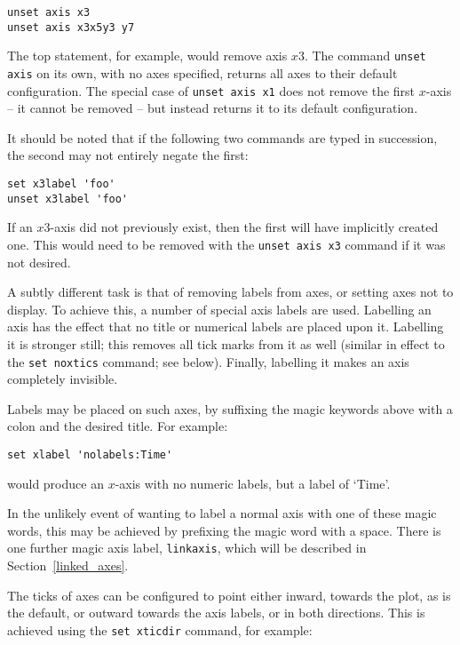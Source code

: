 \begin{verbatim}
unset axis x3
unset axis x3x5y3 y7
\end{verbatim}

\noindent The top statement, for example, would remove axis $x3$. The command
{\tt unset axis} on its own, with no axes specified, returns all axes to
their default configuration.  The special case of {\tt unset axis x1} does
not remove the first $x$-axis -- it cannot be removed -- but instead returns it
to its default configuration.

It should be noted that if the following two commands are typed in succession,
the second may not entirely negate the first:

\begin{verbatim}
set x3label 'foo'
unset x3label 'foo'
\end{verbatim}

\noindent If an $x3$-axis did not previously exist, then the first will have
implicitly created one. This would need to be removed with the {\tt unset axis
x3} command if it was not desired.

A subtly different task is that of removing labels from axes, or setting axes
not to display. To achieve this, a number of special axis labels are used.
Labelling an axis  has the effect that no title or numerical
labels are placed upon it. Labelling it\label{nolabelstics}
 is stronger still; this removes all tick marks from it
as well (similar in effect to the {\tt set noxtics} command; see below).
Finally, labelling it  makes an axis completely invisible.

Labels may be placed on such axes, by suffixing the magic keywords above with a
colon and the desired title. For example:

\begin{verbatim}
set xlabel 'nolabels:Time'
\end{verbatim}

\noindent would produce an $x$-axis with no numeric labels, but a label of
`Time'.

In the unlikely event of wanting
to label a normal axis with one of these magic words, this may be achieved by prefixing the magic
word with a space. There is one further magic axis label, {\tt linkaxis},
which will be described in Section~\ref{linked_axes}.

The ticks of axes can be configured to point either inward, towards the plot,
as is the default, or outward towards the axis labels, or in both directions.
This is achieved using the {\tt set xticdir} command, for example:

